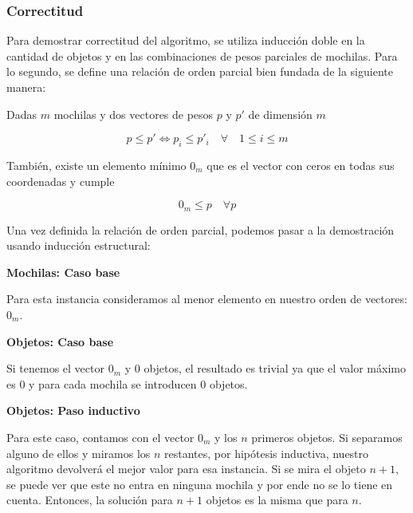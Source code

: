 \subsubsection{Correctitud}

Para demostrar correctitud del algoritmo, se utiliza inducción doble en la cantidad de objetos y en las combinaciones de pesos parciales de mochilas. Para lo segundo, se define una relación de orden parcial bien fundada de la siguiente manera:

Dadas $m$ mochilas y dos vectores de pesos $p$ y $p'$ de dimensión $m$

$$p \leq p' \Leftrightarrow p_i \leq p'_i \quad \forall \quad 1 \leq i \leq m$$

También, existe un elemento mínimo $0_m$ que es el vector con ceros en todas sus coordenadas y cumple

$$0_m \leq p \quad \forall p$$

Una vez definida la relación de orden parcial, podemos pasar a la demostración usando inducción estructural:

\vspace{5mm}

{\Large\textbf{Mochilas: Caso base}}

\vspace{5mm}

Para esta instancia consideramos al menor elemento en nuestro orden de vectores: $0_m$.

\vspace{5mm}

{\large\textbf{Objetos: Caso base}}

\vspace{5mm}

Si tenemos el vector $0_m$ y $0$ objetos, el resultado es trivial ya que el valor máximo es $0$ y para cada mochila se introducen $0$ objetos.

\vspace{5mm}

{\large\textbf{Objetos: Paso inductivo}}

\vspace{5mm}

Para este caso, contamos con el vector $0_m$ y los $n$ primeros objetos. Si separamos alguno de ellos y miramos los $n$ restantes, por hipótesis inductiva, nuestro algoritmo devolverá el mejor valor para esa instancia. Si se mira el objeto $n + 1$, se puede ver que este no entra en ninguna mochila y por ende no se lo tiene en cuenta. Entonces, la solución para $n + 1$ objetos es la misma que para $n$.

